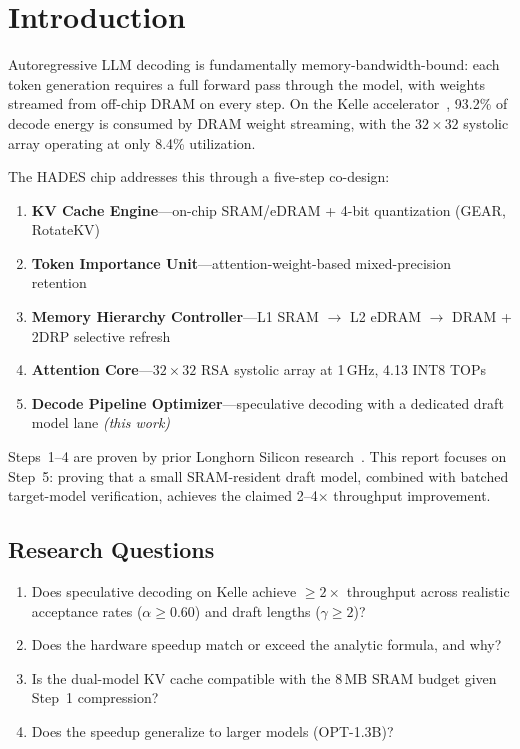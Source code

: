 \documentclass[conference]{IEEEtran}
\begin{document}
\section{Introduction}

Autoregressive LLM decoding is fundamentally memory-bandwidth-bound: each token
generation requires a full forward pass through the model, with weights streamed
from off-chip DRAM on every step.
On the Kelle accelerator~\cite{kelle2025}, 93.2\% of decode energy is consumed
by DRAM weight streaming, with the $32{\times}32$ systolic array operating at
only 8.4\% utilization.

The HADES chip addresses this through a five-step co-design:
\begin{enumerate}
  \item \textbf{KV Cache Engine}---on-chip SRAM/eDRAM + 4-bit quantization
        (GEAR, RotateKV)~\cite{dontwastebits,turboquant,gear,rotatekv}
  \item \textbf{Token Importance Unit}---attention-weight-based mixed-precision
        retention~\cite{kelle2025}
  \item \textbf{Memory Hierarchy Controller}---L1 SRAM $\to$ L2 eDRAM $\to$
        DRAM + 2DRP selective refresh~\cite{kelle2025}
  \item \textbf{Attention Core}---$32{\times}32$ RSA systolic array at 1\,GHz,
        4.13 INT8 TOPs
  \item \textbf{Decode Pipeline Optimizer}---speculative decoding with a
        dedicated draft model lane \emph{(this work)}
\end{enumerate}

Steps~1--4 are proven by prior Longhorn Silicon research~\cite{kelle2025,
dontwastebits,turboquant,lasso}.
This report focuses on Step~5: proving that a small SRAM-resident draft model,
combined with batched target-model verification, achieves the claimed 2--4$\times$
throughput improvement.

\subsection{Research Questions}
\begin{enumerate}
  \item Does speculative decoding on Kelle achieve $\ge 2\times$ throughput
        across realistic acceptance rates ($\alpha \ge 0.60$) and draft lengths
        ($\gamma \ge 2$)?
  \item Does the hardware speedup match or exceed the analytic formula, and why?
  \item Is the dual-model KV cache compatible with the 8\,MB SRAM budget given
        Step~1 compression?
  \item Does the speedup generalize to larger models (OPT-1.3B)?
\end{enumerate}
\end{document}
